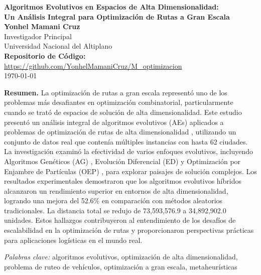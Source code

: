 \documentclass[12pt,a4paper]{article}
\begin{document}
\begin{titlepage}
\begin{center}
\vspace*{2cm}

{\LARGE \textbf{Algoritmos Evolutivos en Espacios de Alta Dimensionalidad:}}\\[0.5em]
{\LARGE \textbf{Un Análisis Integral para Optimización de Rutas a Gran Escala}}\\[4em]

{\Large \textbf{Yonhel Mamani Cruz}}\\[0.5em]
Investigador Principal\\
Universidad Nacional del Altiplano\\[0.5em]

\textbf{Repositorio de Código:} \url{https://github.com/YonhelMamaniCruz/M_optimizacion}\\[4em]

{\large \today}
\end{center}
\end{titlepage}

\noindent\textbf{Resumen.} La optimización de rutas a gran escala representó uno de los problemas más desafiantes en optimización combinatorial, particularmente cuando se trató de espacios de solución de alta dimensionalidad. Este estudio presentó un análisis integral de algoritmos evolutivos (AEs) aplicados a problemas de optimización de rutas de alta dimensionalidad \cite{talbi2009,gendreau2010}, utilizando un conjunto de datos real que contenía múltiples instancias con hasta 62 ciudades. La investigación examinó la efectividad de varios enfoques evolutivos, incluyendo Algoritmos Genéticos (AG) \cite{goldberg1989,holland1992}, Evolución Diferencial (ED) \cite{storn1997,price2013} y Optimización por Enjambre de Partículas (OEP) \cite{eberhart1995,kennedy2001}, para explorar paisajes de solución complejos. Los resultados experimentales demostraron que los algoritmos evolutivos híbridos \cite{back2013} alcanzaron un rendimiento superior en entornos de alta dimensionalidad, logrando una mejora del 52.6\% en comparación con métodos aleatorios tradicionales. La distancia total se redujo de 73,593,576.9 a 34,892,902.0 unidades. Estos hallazgos contribuyeron al entendimiento de los desafíos de escalabilidad en la optimización de rutas \cite{lozano2011} y proporcionaron perspectivas prácticas para aplicaciones logísticas en el mundo real.

\vspace{1em}
\noindent\textit{Palabras clave:} algoritmos evolutivos, optimización de alta dimensionalidad, problema de ruteo de vehículos, optimización a gran escala, metaheurísticas
\end{document}
